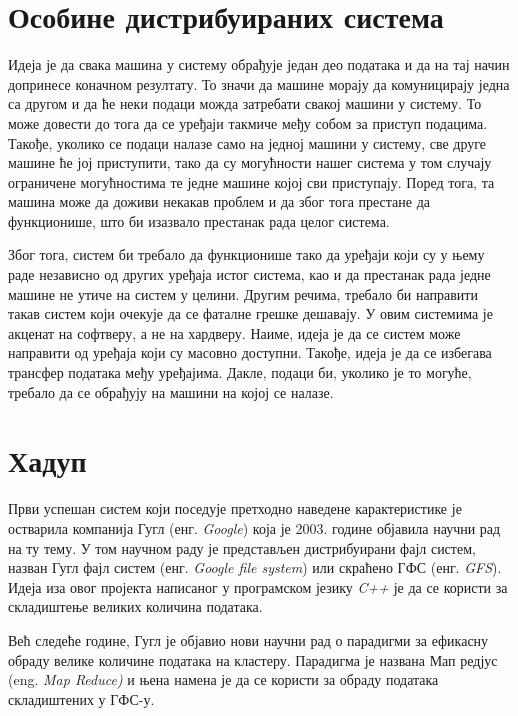 \documentclass[12pt,oneside]{memoir}
\begin{document}
\section{Особине дистрибуираних система}
\label{sec:scaling_osobine}

Идеја је да свака машина у систему обрађује један део података и да на тај начин допринесе коначном резултату. То значи да машине морају да комуницирају једна са другом и да ће неки подаци можда затребати свакој машини у систему. То може довести до тога да се уређаји такмиче међу собом за приступ подацима. Такође, уколико се подаци налазе само на једној машини у систему, све друге машине ће јој приступити, тако да су могућности нашег система у том случају ограничене могућностима те једне машине којој сви приступају. Поред тога, та машина може да доживи некакав проблем и да због тога престане да функционише, што би изазвало престанак рада целог система. \cite{hadoop_beginner}

Због тога, систем би требало да функционише тако да уређаји који су у њему раде независно од других уређаја истог система, као и да престанак рада једне машине не утиче на систем у целини. Другим речима, требало би направити такав систем који очекује да се фаталне грешке дешавају. У овим системима је акценат на софтверу, а не на хардверу. Наиме, идеја је да се систем може направити од уређаја који су масовно доступни. Такође, идеја је да се избегава трансфер података међу уређајима. Дакле, подаци би, уколико је то могуће, требало да се обрађују на машини на којој се налазе. \cite{hadoop_beginner}

\section{Хадуп}
\label{sec:hadoop}

Први успешан систем који поседује претходно наведене карактеристике је остварила компанија Гугл (енг. \textit{Google}) која је 2003. године објавила научни рад на ту тему. У том научном раду је представљен дистрибуирани фајл систем, назван Гугл фајл систем (енг. \textit{Google file system}) или скраћено ГФС (енг. \textit{GFS}). Идеја иза овог пројекта написаног у програмском језику \textit{C++} је да се користи за складиштење великих количина података. \cite{gfs}

Већ следеће године, Гугл је објавио нови научни рад о парадигми за ефикасну обраду велике количине података на кластеру. Парадигма је названа Мап редјус (eng. \textit{Map Reduce)} и њена намена је да се користи за обраду података складиштених у ГФС-у. \cite{gmr}
\end{document}
